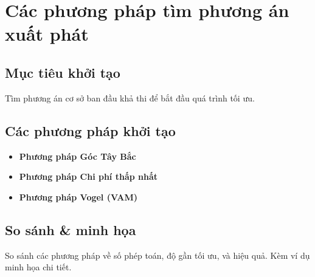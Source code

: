 \chapter{Các phương pháp tìm phương án xuất phát}
\section{Mục tiêu khởi tạo}
Tìm phương án cơ sở ban đầu khả thi để bắt đầu quá trình tối ưu.

\section{Các phương pháp khởi tạo}
\begin{itemize}
    \item \textbf{Phương pháp Góc Tây Bắc}
    \item \textbf{Phương pháp Chi phí thấp nhất}
    \item \textbf{Phương pháp Vogel (VAM)}
\end{itemize}

\section{So sánh \& minh họa}
So sánh các phương pháp về số phép toán, độ gần tối ưu, và hiệu quả. Kèm ví dụ minh họa chi tiết.

